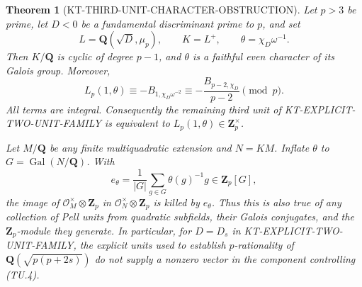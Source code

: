 \documentclass[11pt,a4paper]{article}
\newtheorem{theorem}{Theorem}[section]
\theoremstyle{definition}
\begin{document}
\begin{theorem}[KT-THIRD-UNIT-CHARACTER-OBSTRUCTION]
Let $p>3$ be prime, let $D<0$ be a fundamental discriminant prime
to $p$, and set
\[
 L=\mathbf Q(\sqrt D,\mu_p),\qquad K=L^+,
 \qquad\theta=\chi_D\omega^{-1}.                          \tag{TU.3}
\]
Then $K/\mathbf Q$ is cyclic of degree $p-1$, and $\theta$ is a
faithful even character of its Galois group.  Moreover,
\[
 L_p(1,\theta)\equiv-B_{1,\chi_D\omega^{-2}}
       \equiv-\frac{B_{p-2,\chi_D}}{p-2}\pmod p.           \tag{TU.4}
\]
All terms are integral.  Consequently the remaining third unit of
KT-EXPLICIT-TWO-UNIT-FAMILY is equivalent to
$L_p(1,\theta)\in\mathbf Z_p^\times$.

Let $M/\mathbf Q$ be any finite multiquadratic extension and
$N=KM$.  Inflate $\theta$ to $G=\operatorname{Gal}(N/\mathbf Q)$.
With
\[
 e_\theta=\frac1{|G|}\sum_{g\in G}\theta(g)^{-1}g
          \in\mathbf Z_p[G],                              \tag{TU.5}
\]
the image of $\mathcal O_M^\times\otimes\mathbf Z_p$ in
$\mathcal O_N^\times\otimes\mathbf Z_p$ is killed by
$e_\theta$.  Thus this is also true of any collection of Pell
units from quadratic subfields, their Galois conjugates, and the
$\mathbf Z_p$-module they generate.  In particular, for $D=D_s$
in KT-EXPLICIT-TWO-UNIT-FAMILY, the explicit units used to
establish $p$-rationality of
$\mathbf Q(\sqrt{p(p+2s)})$ do not supply a nonzero vector in
the component controlling (TU.4).
\end{theorem}
\end{document}
